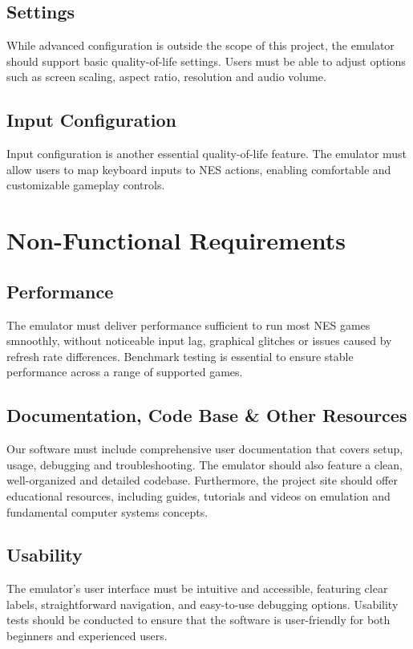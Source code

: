 \documentclass[a4paper, 11pt]{article}
\begin{document}
\subsection{Settings}
While advanced configuration is outside the scope of this project, the emulator should support basic quality-of-life settings. Users must be able to adjust options such as screen scaling, aspect ratio, resolution and audio volume.

\subsection{Input Configuration}
Input configuration is another essential quality-of-life feature. The emulator must allow users to map keyboard inputs to NES actions, enabling comfortable and customizable gameplay controls.

\section{Non-Functional Requirements}

\subsection{Performance}
The emulator must deliver performance sufficient to run most NES games smnoothly, without noticeable input lag, graphical glitches or issues caused by refresh rate differences. Benchmark testing is essential to ensure stable performance across a range of supported games.
\subsection{Documentation, Code Base \& Other Resources}
Our software must include comprehensive user documentation that covers setup, usage, debugging and troubleshooting. The emulator should also feature a clean, well-organized and detailed codebase. Furthermore, the project site should offer educational resources, including guides, tutorials and videos on emulation and fundamental computer systems concepts.
\subsection{Usability}
The emulator's user interface must be intuitive and accessible, featuring clear labels, straightforward navigation, and easy-to-use debugging options. Usability tests should be conducted to ensure that the software is user-friendly for both beginners and experienced users.
\end{document}
